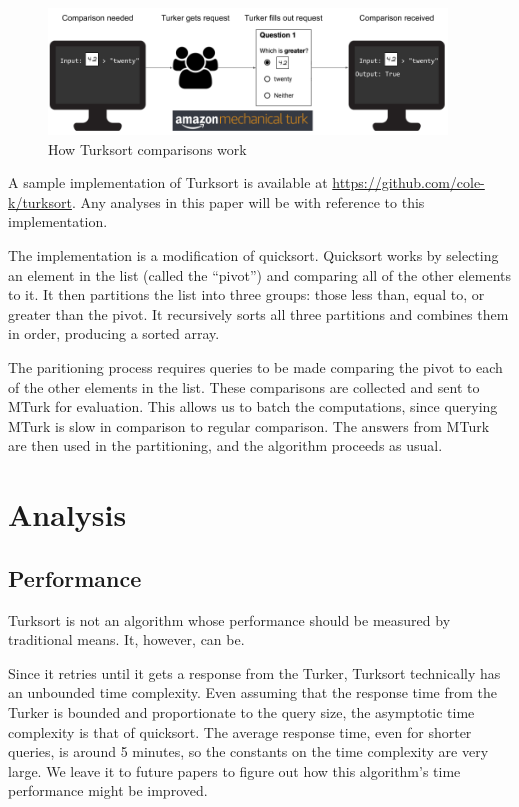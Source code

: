 \documentclass{article}
\begin{document}
\begin{figure}
  \centering
  \includegraphics[width=300pt]{diagram-1.png}
  \caption{How Turksort comparisons work}
  \label{fig:comparison}
\end{figure}

A sample implementation of Turksort is available at
\url{https://github.com/cole-k/turksort}. Any analyses in this paper will be
with reference to this implementation.

The implementation is a modification of quicksort. Quicksort works by selecting
an element in the list (called the ``pivot'') and comparing all of the other
elements to it. It then partitions the list into three groups: those less than,
equal to, or greater than the pivot. It recursively sorts all three partitions
and combines them in order, producing a sorted array.

The paritioning process requires queries to be made comparing the pivot to each
of the other elements in the list. These comparisons are collected and sent to
MTurk for evaluation. This allows us to batch the computations, since querying
MTurk is slow in comparison to regular comparison. The answers from MTurk are
then used in the partitioning, and the algorithm proceeds as usual.

\section{Analysis}

\subsection{Performance}
Turksort is not an algorithm whose performance should be measured by traditional
means. It, however, can be.

Since it retries until it gets a response from the Turker, Turksort technically
has an unbounded time complexity. Even assuming that the response time from the
Turker is bounded and proportionate to the query size, the asymptotic time
complexity is that of quicksort. The average response time, even for shorter
queries, is around 5 minutes, so the constants on the time complexity are very
large. We leave it to future papers to figure out how this algorithm's time
performance might be improved.
\end{document}
